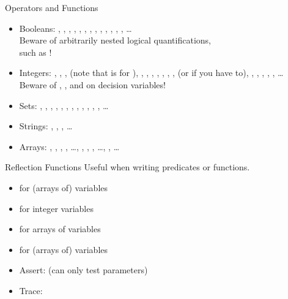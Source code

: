 \documentclass{cons-beamer}
\begin{document}
\begin{flashcardminizinc}
\begin{frame}{Operators and Functions}
  \begin{itemize}
  \item Booleans: , \mzninline{/\\}, \mzninline{\\/},
    \mzninline{<->}, \mzninline{->}, \mzninline{<-}, ,
    , , ,
    , , ,
    \dots \\ \alert{Beware of arbitrarily nested logical
      quantifications, \\ such as}
    \alert{!}  \vfill
  \item Integers: \mzninline{+}, \mzninline{-}, \mzninline{*},
     \alert{(note that \mzninline{/} is for
      )}, , ,
    , , ,
    , , \mzninline{=} \alert{(or
      \mzninline{==} if you have to)}, \mzninline{<}, \mzninline{<=},
    \mzninline{=>}, \mzninline{>}, \mzninline{\!=}, \dots \\
    \alert{Beware of , , and
       on decision variables!} \vfill
  \item Sets: , , ,
    , , ,
    , ,
    , ,
    , , \dots \vfill
  \item Strings: \mzninline{++}, , ,
    \dots \vfill
  \item Arrays: , ,
    , , \dots,
    , ,
    , \dots, , \dots
  \end{itemize}
\end{frame}

\begin{frame}[fragile]{Reflection Functions}
Useful when writing predicates or functions.
  \begin{itemize}
  \item {} for (arrays of) variables
  \item {} for integer variables
  \item {} for arrays of variables
  \item {} for (arrays of) variables
  \item Assert:  (can only test parameters)
  \item Trace: 
  \end{itemize}
\end{frame}


\end{flashcardminizinc}
\end{document}
